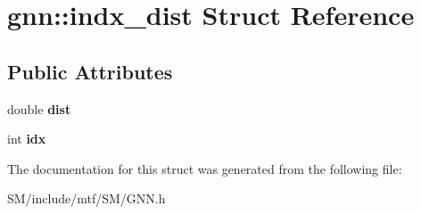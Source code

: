 \hypertarget{structgnn_1_1indx__dist}{\section{gnn\-:\-:indx\-\_\-dist Struct Reference}
\label{structgnn_1_1indx__dist}
}
\subsection*{Public Attributes}
\begin{DoxyCompactItemize}
\item 
\hypertarget{structgnn_1_1indx__dist_a8ac4004fe0bc851b8aa24d95d8229a7d}{double {\bfseries dist}}\label{structgnn_1_1indx__dist_a8ac4004fe0bc851b8aa24d95d8229a7d}

\item 
\hypertarget{structgnn_1_1indx__dist_a38df80abad8420f747e97ee00432a3bc}{int {\bfseries idx}}\label{structgnn_1_1indx__dist_a38df80abad8420f747e97ee00432a3bc}

\end{DoxyCompactItemize}


The documentation for this struct was generated from the following file\-:\begin{DoxyCompactItemize}
\item 
S\-M/include/mtf/\-S\-M/G\-N\-N.\-h\end{DoxyCompactItemize}
